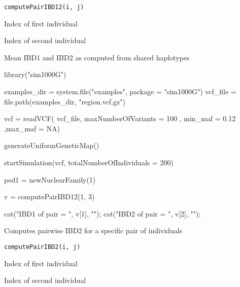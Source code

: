 \documentclass[letterpaper]{book}
\begin{document}
%
\begin{Usage}
\begin{verbatim}
computePairIBD12(i, j)
\end{verbatim}
\end{Usage}
%
\begin{Arguments}
\begin{ldescription}
\item[\code{i}] Index of first individual

\item[\code{j}] Index of second individual
\end{ldescription}
\end{Arguments}
%
\begin{Value}
Mean IBD1 and IBD2 as computed from shared haplotypes
\end{Value}
%
\begin{Examples}
\begin{ExampleCode}

library("sim1000G")

examples_dir = system.file("examples", package = "sim1000G")
vcf_file = file.path(examples_dir, "region.vcf.gz")

vcf = readVCF( vcf_file, maxNumberOfVariants = 100 ,
               min_maf = 0.12 ,max_maf = NA)

generateUniformGeneticMap()

startSimulation(vcf, totalNumberOfIndividuals = 200)

ped1 = newNuclearFamily(1)

v = computePairIBD12(1, 3)

cat("IBD1 of pair = ", v[1], "\n");
cat("IBD2 of pair = ", v[2], "\n");


\end{ExampleCode}
\end{Examples}
%
\begin{Description}\relax
Computes pairwise IBD2 for a specific pair of individuals
\end{Description}
%
\begin{Usage}
\begin{verbatim}
computePairIBD2(i, j)
\end{verbatim}
\end{Usage}
%
\begin{Arguments}
\begin{ldescription}
\item[\code{i}] Index of first individual

\item[\code{j}] Index of second individual
\end{ldescription}
\end{Arguments}
\end{document}
